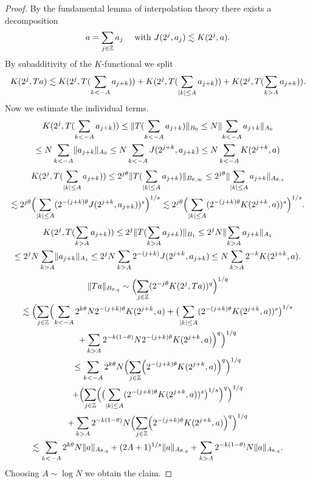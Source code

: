 \begin{proof}
By the fundamental lemma of interpolation theory there exists a decomposition
\[
a = \sum_{j\in\mathbb{Z}} a_{j}
\quad
\text{ with }
J(2^{j},a_{j}) \lesssim K(2^{j},a).
\]
By subadditivity of the $K$-functional we split
\[
K(2^{j}, Ta)
\lesssim
K(2^{j}, T (\sum_{k<-A} a_{j+k}) )
+
K(2^{j}, T (\sum_{\lvert k\rvert \leq A} a_{j+k}) )
+
K(2^{j}, T (\sum_{k > A} a_{j+k}) ).
\]
Now we estimate the individual terms.
\begin{multline*}
K(2^{j}, T (\sum_{k<-A} a_{j+k}) )
\leq
\lVert T (\sum_{k<-A} a_{j+k}) \rVert_{B_{0}}
\leq
N \lVert \sum_{k<-A} a_{j+k} \rVert_{A_{0}}\\
\leq
N \sum_{k<-A} \lVert a_{j+k} \rVert_{A_{0}}
\leq
N \sum_{k<-A} J(2^{j+k}, a_{j+k} )
\leq
N \sum_{k<-A} K(2^{j+k}, a )
\end{multline*}
\begin{multline*}
K(2^{j}, T (\sum_{\lvert k\rvert \leq A} a_{j+k}) )
\leq
2^{j\theta} \lVert T (\sum_{\lvert k\rvert \leq A} a_{j+k}) \rVert_{B_{\theta,\infty}}
\leq
2^{j\theta} \lVert \sum_{\lvert k\rvert \leq A} a_{j+k} \rVert_{A_{\theta,s}}\\
\lesssim
2^{j\theta} \Bigl( \sum_{\lvert k\rvert \leq A} (2^{-(j+k)\theta} J(2^{j+k}, a_{j+k}) )^{s} \Bigr)^{1/s}
\lesssim
2^{j\theta} \Bigl( \sum_{\lvert k\rvert \leq A} (2^{-(j+k)\theta} K(2^{j+k}, a) )^{s} \Bigr)^{1/s}.
\end{multline*}
\begin{multline*}
K(2^{j}, T (\sum_{k>A} a_{j+k}) )
\leq
2^{j} \lVert T (\sum_{k>A} a_{j+k}) \rVert_{B_{1}}
\leq
2^{j} N \lVert \sum_{k>A} a_{j+k} \rVert_{A_{1}}\\
\leq
2^{j} N \sum_{k>A} \lVert a_{j+k} \rVert_{A_{1}}
\leq
2^{j} N \sum_{k>A} 2^{-(j+k)} J(2^{j+k}, a_{j+k} )
\leq
N \sum_{k>A} 2^{-k} K(2^{j+k}, a ).
\end{multline*}
\begin{multline*}
\lVert Ta\rVert_{B_{\theta,q}}
\sim
\Bigl( \sum_{j\in\mathbb{Z}} (2^{-j\theta} K(2^{j}, Ta) )^{q} \Bigr)^{1/q}\\
\lesssim
\Bigl( \sum_{j\in\mathbb{Z}} \Bigl( \sum_{k<-A} 2^{k\theta} N 2^{-(j+k)\theta} K(2^{j+k}, a)
+ \bigl( \sum_{\lvert k\rvert \leq A} (2^{-(j+k)\theta} K(2^{j+k}, a) )^{s} \bigr)^{1/s}\\
+ \sum_{k>A} 2^{-k(1-\theta)} N 2^{-(j+k)\theta} K(2^{j+k}, a) \Bigr)^{q} \Bigr)^{1/q}\\
\leq
\sum_{k<-A} 2^{k\theta} N \Bigl( \sum_{j\in\mathbb{Z}} \Bigl( 2^{-(j+k)\theta} K(2^{j+k}, a) \Bigr)^{q} \Bigr)^{1/q}\\
+ \Bigl( \sum_{j\in\mathbb{Z}} \Bigl( \bigl( \sum_{\lvert k\rvert \leq A} (2^{-(j+k)\theta} K(2^{j+k}, a) )^{s} \bigr)^{1/s} \Bigr)^{q} \Bigr)^{1/q}\\
+ \sum_{k>A} 2^{-k(1-\theta)} N \Bigl( \sum_{j\in\mathbb{Z}} \Bigl( 2^{-(j+k)\theta} K(2^{j+k}, a) \Bigr)^{q} \Bigr)^{1/q}\\
\lesssim
\sum_{k<-A} 2^{k\theta} N \lVert a\rVert_{A_{\theta,q}}
+ (2A+1)^{1/s} \lVert a\rVert_{A_{\theta,q}}
+ \sum_{k>A} 2^{-k(1-\theta)} N \lVert a\rVert_{A_{\theta,q}}.
\end{multline*}
Choosing $A \sim \log N$ we obtain the claim.
\end{proof}


